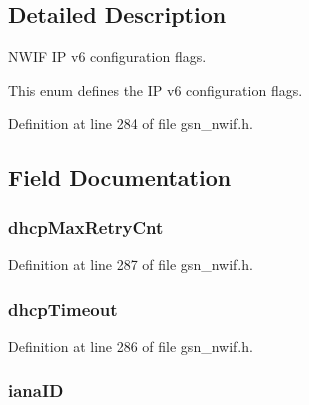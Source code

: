\subsection{Detailed Description}
NWIF IP v6 configuration flags. 

This enum defines the IP v6 configuration flags. 

Definition at line 284 of file gsn\_\-nwif.h.



\subsection{Field Documentation}
\hypertarget{a00168_adfe6154e4e0eb3a2a020a6473fd9ef28}{
\subsubsection[{dhcpMaxRetryCnt}]{ {\bf dhcpMaxRetryCnt}}}
\label{a00168_adfe6154e4e0eb3a2a020a6473fd9ef28}


Definition at line 287 of file gsn\_\-nwif.h.

\hypertarget{a00168_a3be33cc128077b2e16f822c8415f10dc}{
\subsubsection[{dhcpTimeout}]{ {\bf dhcpTimeout}}}
\label{a00168_a3be33cc128077b2e16f822c8415f10dc}


Definition at line 286 of file gsn\_\-nwif.h.

\hypertarget{a00168_a533aa31f7aca04d55df9377af78e48eb}{
\subsubsection[{ianaID}]{ {\bf ianaID}}}
\label{a00168_a533aa31f7aca04d55df9377af78e48eb}


